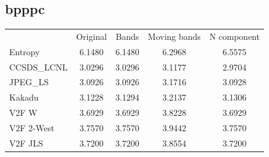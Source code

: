 \documentclass{article}
\begin{document}
\subsection*{bpppc}
\begin{table}[h]
\begin{tabular}{lcccc}
\rowcolor[HTML]{C0C0C0} 
 & Original & Bands & Moving bands & N component \\
\cellcolor[HTML]{C0C0C0}Entropy & \cellcolor[HTML]{E0E0E0} 6.1480 &  \cellcolor[HTML]{E0E0E0} 6.1480 &  \cellcolor[HTML]{E0E0E0} 6.2968 &  \cellcolor[HTML]{E0E0E0} 6.5575\\ 
\cellcolor[HTML]{C0C0C0}CCSDS\_LCNL & 3.0296 & 3.0296 & 3.1177 & \cellcolor[HTML]{DAE8FC}2.9704  \\
\cellcolor[HTML]{C0C0C0}JPEG\_LS    & \cellcolor[HTML]{DAE8FC}3.0926 & \cellcolor[HTML]{DAE8FC}3.0926 & 3.1716 & 3.0928  \\
\cellcolor[HTML]{C0C0C0}Kakadu      & \cellcolor[HTML]{DAE8FC}3.1228 & 3.1294 & 3.2137 & 3.1306 \\
\cellcolor[HTML]{C0C0C0}V2F W       & \cellcolor[HTML]{DAE8FC}3.6929 & \cellcolor[HTML]{DAE8FC}3.6929 & 3.8228 & \cellcolor[HTML]{DAE8FC}3.6929  \\
\cellcolor[HTML]{C0C0C0}V2F 2-West  & \cellcolor[HTML]{DAE8FC}3.7570 & \cellcolor[HTML]{DAE8FC}3.7570 & 3.9442 & \cellcolor[HTML]{DAE8FC}3.7570  \\
\cellcolor[HTML]{C0C0C0}V2F JLS     & \cellcolor[HTML]{DAE8FC}3.7200 & \cellcolor[HTML]{DAE8FC}3.7200 & 3.8554 & \cellcolor[HTML]{DAE8FC}3.7200  \\
\end{tabular}
\end{table}
\end{document}
